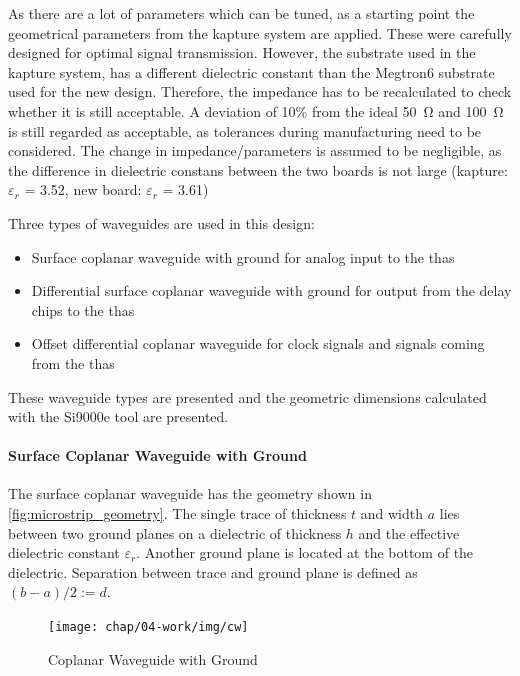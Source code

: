 As there are a lot of parameters which can be tuned, as a starting point the geometrical parameters from the \gls{kapture} system are applied. 
These were carefully designed for optimal signal transmission.
However, the substrate used in the \gls{kapture} system, has a different dielectric constant than the Megtron6 substrate used for the new design. 
Therefore, the impedance has to be recalculated to check whether it is still acceptable. 
A deviation of 10\% from the ideal \SI{50}{\ohm} and \SI{100}{\ohm} is still regarded as acceptable, as tolerances during manufacturing need to be considered.
The change in impedance/parameters is assumed to be negligible, as the difference in dielectric constans between the two boards is not large (\gls{kapture}: $\varepsilon_r$ =  3.52, new board: $\varepsilon_r$ =  3.61)

Three types of waveguides are used in this design:
\begin{itemize}
	\item Surface coplanar waveguide with ground for analog input to the \glspl{tha} 
	\item Differential surface coplanar waveguide with ground for output from the delay chips to the \glspl{tha}
	\item Offset differential coplanar waveguide for clock signals and signals coming from the \glspl{tha}
\end{itemize}
These waveguide types are presented and the geometric dimensions calculated with the Si9000e tool are presented.

\paragraph{Surface Coplanar Waveguide with Ground}
The surface coplanar waveguide has the geometry shown in \autoref{fig:microstrip_geometry}.
The single trace of thickness $t$ and width $a$ lies between two ground planes on a dielectric of thickness $h$ and the effective dielectric constant $\varepsilon_r$.
Another ground plane is located at the bottom of the dielectric.
Separation between trace and ground plane is defined as $(b-a)/2 := d$. 

\begin{figure}[!htbp]
	\centering
	\texttt{[image: chap/04-work/img/cw]}
	\caption{Coplanar Waveguide with Ground}
	\label{fig:microstrip_geometry}
\end{figure}

